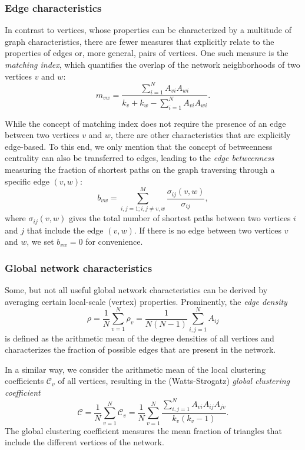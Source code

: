 		\subsubsection{Edge characteristics}
		In contrast to vertices, whose properties can be characterized by a multitude of graph characteristics, there are fewer measures that explicitly relate to the properties of edges or, more general, pairs of vertices. One such measure is the \textit{matching index}, which quantifies the overlap of the network neighborhoods of two vertices $v$ and $w$:
\begin{equation}
  {m}_{vw} =\frac{\sum_{i=1}^N A_{vi}  A_{wi} }{  {k}_v +  {k}_w -\sum_{i=1}^N A_{vi}  A_{wi} }.
\label{eq:matching}
\end{equation}
\noindent

		While the concept of matching index does not require the presence of an edge between two vertices $v$ and $w$, there are other characteristics that are explicitly edge-based. To this end, we only mention that the concept of betweenness centrality can also be transferred to edges, leading to the \textit{edge betweenness} measuring the fraction of shortest paths on the graph traversing through a specific edge $(v,w)$:
\begin{equation}
  {b}_{vw} =\sum_{i,j=1; i,j\neq v,w}^M \frac{  {\sigma}_{ij}(v,w)}{  {\sigma}_{ij}},
\label{eq:edgebetweenness}
\end{equation}
\noindent
where $  {\sigma}_{ij}(v,w)$ gives the total number of shortest paths between two vertices $i$ and $j$ that include the edge $(v,w)$. If there is no edge between two vertices $v$ and $w$, we set $  {b}_{vw}=0$ for convenience. 
        
        		\subsubsection{Global network characteristics}
		Some, but not all useful global network characteristics can be derived by averaging certain local-scale (vertex) properties. Prominently, the \textit{edge density}
\begin{equation}
  {\rho} =\frac{1}{N}\sum_{v=1}^N   {\rho}_v =\frac{1}{N(N-1)} \sum_{i,j=1}^N A_{ij} 
\label{eq:edgedensity}
\end{equation}
is defined as the arithmetic mean of the degree densities of all vertices and characterizes the fraction of possible edges that are present in the network. 

		In a similar way, we consider the arithmetic mean of the local clustering coefficients $  {\mathcal{C}}_v $ of all vertices, resulting in the (Watts-Strogatz) \textit{global clustering coefficient}~\cite{Watts1998}
\begin{equation}
  {\mathcal{C}} =\frac{1}{N}\sum_{v=1}^N   {\mathcal{C}}_v 
= \frac{1}{N}\sum_{v=1}^N \frac{\sum_{i,j=1}^N A_{vi}  A_{ij}  A_{jv} }{  {k}_v (  {k}_v -1)}.
\label{eq:globclustering}
\end{equation}
\noindent
The global clustering coefficient measures the mean fraction of triangles that include the different vertices of the network. 

